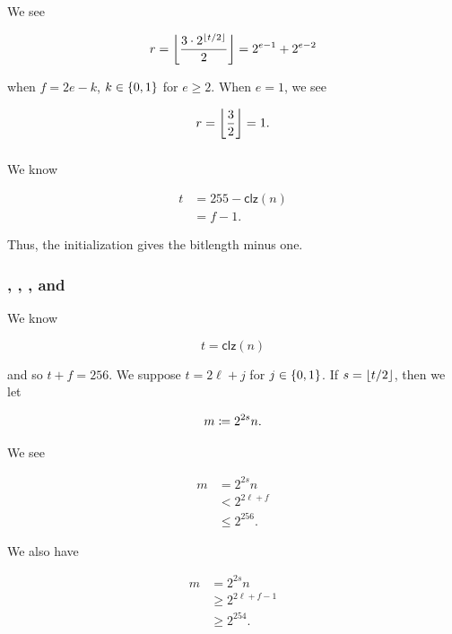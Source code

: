 \noindent
We see

\begin{equation}
    r = \left\lfloor \frac{3\cdot2^{\left\lfloor t/2 \right\rfloor}}{2} \right\rfloor = 2^{e-1} + 2^{e-2}
\end{equation}

\noindent
when $f = 2e-k$, $k\in\left\{ 0,1 \right\}$ for $e\ge2$.
When $e=1$, we see

\begin{equation}
    r = \left\lfloor \frac{3}{2} \right\rfloor = 1.
\end{equation}

\subsubsection{\BitLength{}}
\label{app:initializations:bitlength}

We know

\begin{align}
    t &= 255 - \textsf{clz}(n) \nonumber\\
        &= f-1.
\end{align}

\noindent
Thus, the initialization gives the bitlength minus one.

\subsubsection{\Linear{}, \HyperFour{}, \LookupFour{}, and \LookupEight{}}
\label{app:initializations:linear}

We know

\begin{equation}
    t = \textsf{clz}(n)
\end{equation}

\noindent
and so $t + f = 256$.
We suppose $t = 2\ell + j$ for $j\in\left\{ 0,1 \right\}$.
If $s = \left\lfloor t/2 \right\rfloor$, then we let

\begin{equation}
    m \coloneqq{} 2^{2s}n.
\end{equation}

We see

\begin{align}
    m &= 2^{2s}n \nonumber\\
      &< 2^{2\ell + f} \nonumber\\
      &\le 2^{256}.
\end{align}

\noindent
We also have

\begin{align}
    m &= 2^{2s}n \nonumber\\
      &\ge 2^{2\ell + f-1} \nonumber\\
      &\ge 2^{254}.
\end{align}

